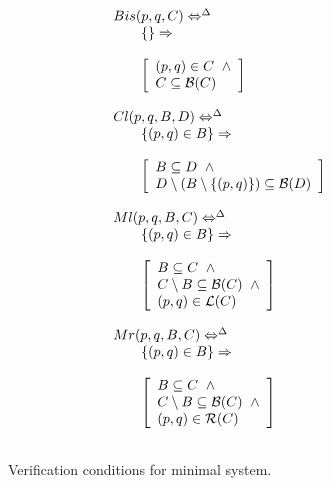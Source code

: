 \begin{figure}
\[
\begin{array}{lll}
\multicolumn{3}{l}{Bis(p,q,C) \Leftrightarrow^{\Delta}}\\
&&\left\{\right\}\Rightarrow\\
\\
&&\left[
\begin{array}{l}
(p,q)\in C\;\;\wedge\\
C\subseteq{\cal B}(C)
\end{array}
\right]\\
\\

\multicolumn{3}{l}{Cl(p,q,B,D) \Leftrightarrow^{\Delta}}\\
&&\left\{(p,q)\in B\right\}\Rightarrow\\
\\
&&\left[
\begin{array}{l}
B\subseteq D\;\;\wedge\\
D\setminus (B\setminus \{(p,q)\})\subseteq {\cal B}(D)
\end{array}
\right]\\
\\

\multicolumn{3}{l}{Ml(p,q,B,C) \Leftrightarrow^{\Delta}}\\
&&\left\{(p,q)\in B\right\}\Rightarrow\\
\\
&&\left[
\begin{array}{l}
B\subseteq C\;\;\wedge\\
C\setminus B\subseteq {\cal B}(C)\;\;\wedge\\
(p,q)\in{\cal L}(C)
\end{array}
\right]\\
\\

\multicolumn{3}{l}{Mr(p,q,B,C) \Leftrightarrow^{\Delta}}\\
&&\left\{(p,q)\in B\right\}\Rightarrow\\
\\
&&\left[
\begin{array}{l}
B\subseteq C\;\;\wedge\\
C\setminus B\subseteq {\cal B}(C)\;\;\wedge\\
(p,q)\in{\cal R}(C)
\end{array}
\right]\\
\\


\end{array}
\]
\caption{Verification conditions for minimal system.\label{figVerCondA}}
\end{figure}

